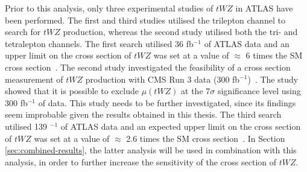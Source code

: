 Prior to this analysis, only three experimental studies of $tWZ$ in ATLAS have been performed. The first and third studies utilised the trilepton channel to search for $tWZ$ production, whereas the second study utilised both the tri- and tetralepton channels. The first search utilised 36 fb$^{-1}$ of ATLAS data and an upper limit on the cross section of $tWZ$ was set at a value of $\approx$ 6 times the SM cross section~\cite{twz_3_lep}. The second study investigated the feasibility of a cross section measurement of $tWZ$ production with CMS Run 3 data (300 fb$^{-1}$)~\cite{Tschida:2020ftz}. The study showed that it is possible to exclude $\mu (tWZ)$ at the $7\sigma$ significance level using 300 fb$^{-1}$ of data. This study needs to be further investigated, since its findings seem improbable given the results obtained in this thesis. The third search utilised 139 $^{-1}$ of ATLAS data and an expected upper limit on the cross section of $tWZ$ was set at a value of $\approx$ 2.6 times the SM cross section~\cite{ben-thesis}. In Section \ref{sec:combined-results}, the latter analysis will be used in combination with this analysis, in order to further increase the sensitivity of the cross section of $tWZ$.






